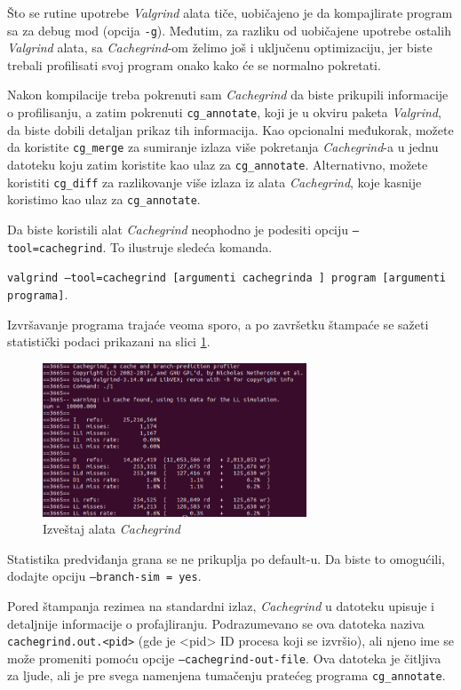 \documentclass[12pt,oneside]{memoir}
\theoremstyle{plain}
\theoremstyle{definition}
\begin{document}
Što se rutine upotrebe \textit{Valgrind} alata tiče, uobičajeno je da kompajlirate program sa za debug mod (opcija \texttt{-g}). Međutim, za razliku od uobičajene upotrebe ostalih \textit{Valgrind} alata, sa \textit{Cachegrind}-om želimo još i uključenu optimizaciju, jer biste trebali profilisati svoj program onako kako će se normalno pokretati. 

Nakon kompilacije treba pokrenuti sam \textit{Cachegrind} da biste prikupili informacije o profilisanju, a zatim pokrenuti \texttt{cg\_annotate}, koji je u okviru paketa \textit{Valgrind}, da biste dobili detaljan prikaz tih informacija. Kao opcionalni međukorak, možete da koristite \texttt{cg\_merge} za sumiranje izlaza više pokretanja \textit{Cachegrind}-a u jednu datoteku koju zatim koristite kao ulaz za \texttt{cg\_annotate}. Alternativno, možete koristiti \texttt{cg\_diff} za razlikovanje više izlaza iz alata \textit{Cachegrind}, koje kasnije koristimo kao ulaz za \texttt{cg\_annotate}.

Da biste koristili alat \textit{Cachegrind} neophodno je podesiti opciju \texttt{–tool=cachegrind}. To ilustruje sledeća komanda. 
\begin{center}
\texttt{valgrind --tool=cachegrind [argumenti cachegrinda ] program [argumenti programa]}.
\end{center}

Izvršavanje programa trajaće veoma sporo, a po završetku štampaće se sažeti statistički podaci prikazani na slici \ref{fig:slika2.15}.
\begin{figure}[!ht]
  \centering
  \includegraphics[width=0.7\textwidth]{CachegrindReport.png}
  \caption{Izveštaj alata \textit{Cachegrind}}
  \label{fig:slika2.15}
\end{figure}
Statistika predviđanja grana se ne prikuplja po default-u. Da biste to omogućili, dodajte opciju \texttt{--branch-sim = yes}.

Pored štampanja rezimea na standardni izlaz, \textit{Cachegrind} u datoteku upisuje i detaljnije informacije o profajliranju. Podrazumevano se ova datoteka naziva \texttt{cachegrind.out.<pid>} (gde je <pid> ID procesa koji se izvršio), ali njeno ime se može promeniti pomoću opcije \texttt{--cachegrind-out-file}. Ova datoteka je čitljiva za ljude, ali je pre svega namenjena tumačenju pratećeg programa \texttt{cg\_annotate}.
\end{document}
